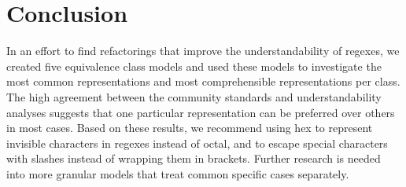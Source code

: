 
\section{Conclusion}
In an effort to find refactorings that improve the understandability of regexes, we created five equivalence class models and used these models to investigate the most common representations and most comprehensible representations per class.  
 The high agreement between the community standards and understandability analyses  suggests that one particular representation can be preferred over others in most cases.  
Based on these results, we recommend using hex to represent invisible characters in regexes instead of octal, and to escape special characters with slashes instead of wrapping them in brackets.  
Further research is needed into more granular models that treat common specific cases separately.
